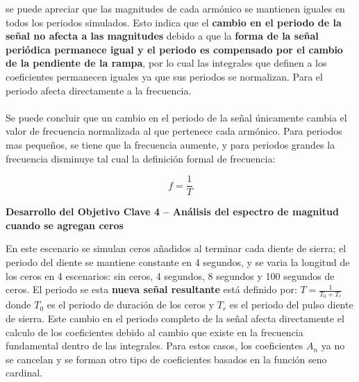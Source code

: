 \documentclass[8pt]{article}
\begin{document}
    se puede apreciar que las magnitudes de cada armónico se mantienen iguales en todos 
    los periodos simulados. Esto indica que el \textbf{cambio en el periodo de la señal no afecta a las 
    magnitudes} debido a que la \textbf{forma de la señal periódica permanece igual y el periodo es 
    compensado por el cambio de la pendiente de la rampa}, por lo cual las integrales que 
    definen a los coeficientes permanecen iguales ya que sus periodos se normalizan. Para el 
    periodo afecta directamente a la frecuencia.\\
    \\
    Se puede concluir que un cambio en el periodo de la señal únicamente cambia el valor de 
    frecuencia normalizada al que pertenece cada armónico. Para periodos mas pequeños, se 
    tiene que la frecuencia aumente, y para periodos grandes la frecuencia disminuye tal cual 
    la definición formal de frecuencia:
    
    \begin{equation}
        f=\frac{1}{T}
    \end{equation}

     \textbf{Desarrollo del Objetivo Clave 4 -- Análisis del espectro de magnitud cuando se agregan ceros}

     En este escenario se simulan ceros añadidos al terminar cada diente de sierra; el periodo del 
     diente se mantiene constante en 4 segundos, y se varia la longitud de los ceros en 4 escenarios: sin 
     ceros, 4 segundos, 8 segundos y 100 segundos de ceros. El periodo se esta \textbf{nueva señal resultante}
     está definido por: $T=\frac{1}{T_0+T_r}$ donde $T_0$ es el periodo de duración de los ceros y $T_r$ es el periodo 
     del pulso diente de sierra. Este cambio en el periodo completo de la señal afecta directamente el 
     calculo de los coeficientes debido al cambio que existe en la frecuencia fundamental dentro de las 
     integrales. Para estos casos, los coeficientes $A_n$ ya no se cancelan y se forman otro tipo de 
     coeficientes basados en la función seno cardinal.
\end{document}
